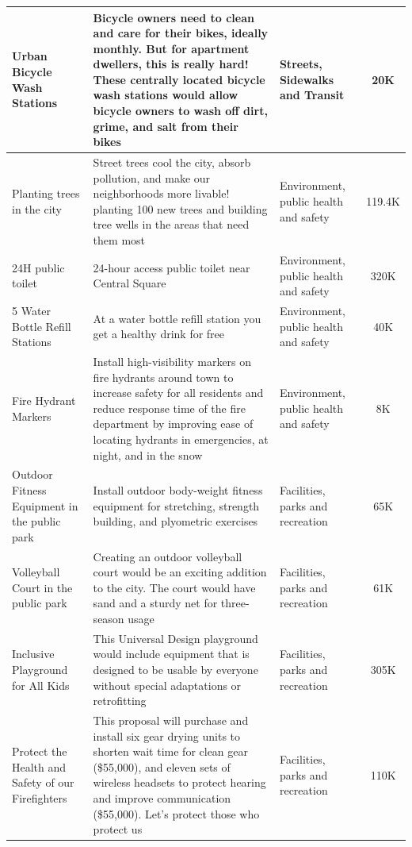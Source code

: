 \documentclass[10pt]{article}
\begin{document}
\begin{appendices}
\begin{longtable}[ht!]{|p{4cm}|p{8cm}|p{3cm}|c|}
    \hline
    Urban Bicycle Wash Stations & Bicycle owners need to clean and care for their bikes, ideally monthly. But for apartment dwellers, this is really hard! These centrally located bicycle wash stations would allow bicycle owners to wash off dirt, grime, and salt from their bikes & Streets, Sidewalks and Transit & 20K\\
    \hline
    Planting trees in the city & Street trees cool the city, absorb pollution, and make our neighborhoods more livable! planting 100 new trees and building tree wells in the areas that need them most & Environment, public health and safety & 119.4K\\
    \hline
    24H public toilet & 24-hour access public toilet near Central Square & Environment, public health and safety & 320K\\
    \hline
    5 Water Bottle Refill Stations & At a water bottle refill station you get a healthy drink for free & Environment, public health and safety & 40K\\
    \hline
    Fire Hydrant Markers & Install high-visibility markers on fire hydrants around town to increase safety for all residents and reduce response time of the fire department by improving ease of locating hydrants in emergencies, at night, and in the snow & Environment, public health and safety & 8K\\
    \hline
    Outdoor Fitness Equipment in the public park & Install outdoor body-weight fitness equipment for stretching, strength building, and plyometric exercises & Facilities, parks and recreation & 65K\\
    \hline
    Volleyball Court in the public park & Creating an outdoor volleyball court would be an exciting addition to the city. The court would have sand and a sturdy net for three-season usage & Facilities, parks and recreation & 61K\\
    \hline
    Inclusive Playground for All Kids & This Universal Design playground would include equipment that is designed to be usable by everyone without special adaptations or retrofitting & Facilities, parks and recreation & 305K\\
    \hline
    Protect the Health and Safety of our Firefighters & This proposal will purchase and install six gear drying units to shorten wait time for clean gear (\$55,000), and eleven sets of wireless headsets to protect hearing and improve communication (\$55,000). Let’s protect those who protect us & Facilities, parks and recreation & 110K\\

\end{longtable}
\end{appendices}
\end{document}

